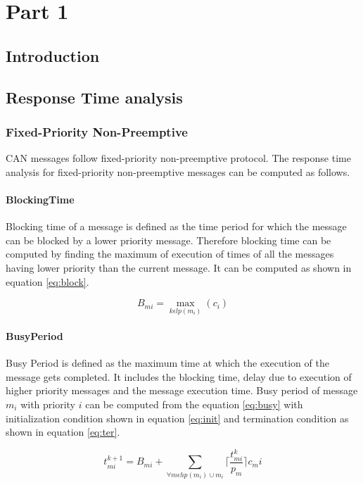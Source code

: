 \chapter{Part 1}

\section{Introduction}

\section{Response Time analysis}
\subsection{Fixed-Priority Non-Preemptive}
CAN messages follow fixed-priority non-preemptive protocol. The response time analysis for fixed-priority non-preemptive messages can be computed as follows.

\subsubsection{BlockingTime}
Blocking time of a message is defined as the time period for which the message can be blocked by a lower priority message. Therefore blocking time can be computed by finding the maximum of execution of times of all the messages having lower priority than the current message. It can be computed as shown in equation \ref{eq:block}.

\begin{equation}
B_{mi}=\max_{k\epsilon lp(m_i)}(c_i) 
\label{eq:block}
\end{equation}

\subsubsection{BusyPeriod}
Busy Period is defined as the maximum time at which the execution of the message gets completed. It includes the blocking time, delay due to execution of higher priority messages and the message execution time. Busy period of message $m_i$ with priority $i$ can be computed from the equation \ref{eq:busy} with initialization condition shown in equation \ref{eq:init} and termination condition as shown in equation \ref{eq:ter}. 

\begin{equation}
 t_{mi}^{k+1}=B_{mi}+\sum_{\forall m\epsilon hp(m_i)\cup m_i} \lceil{\frac{t_{mi}^k}{p_m}}\rceil c_mi
\label{eq:init}
\end{equation}


